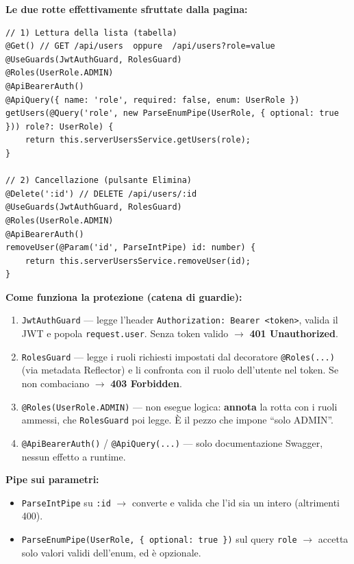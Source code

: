 \documentclass[11pt,a4paper]{article}
\newcommand{\code}[1]{\texttt{\small #1}}
\begin{document}
\textbf{Le due rotte effettivamente sfruttate dalla pagina:}

\begin{lstlisting}[language=TypeScriptX]
// 1) Lettura della lista (tabella)
@Get() // GET /api/users  oppure  /api/users?role=value
@UseGuards(JwtAuthGuard, RolesGuard)
@Roles(UserRole.ADMIN)
@ApiBearerAuth()
@ApiQuery({ name: 'role', required: false, enum: UserRole })
getUsers(@Query('role', new ParseEnumPipe(UserRole, { optional: true })) role?: UserRole) {
    return this.serverUsersService.getUsers(role);
}

// 2) Cancellazione (pulsante Elimina)
@Delete(':id') // DELETE /api/users/:id
@UseGuards(JwtAuthGuard, RolesGuard)
@Roles(UserRole.ADMIN)
@ApiBearerAuth()
removeUser(@Param('id', ParseIntPipe) id: number) {
    return this.serverUsersService.removeUser(id);
}
\end{lstlisting}

\textbf{Come funziona la protezione (catena di guardie):}

\begin{enumerate}[leftmargin=1.6em]
  \item \code{JwtAuthGuard} --- legge l'header \code{Authorization: Bearer <token>},
        valida il JWT e popola \code{request.user}. Senza token valido
        $\rightarrow$ \textbf{401 Unauthorized}.
  \item \code{RolesGuard} --- legge i ruoli richiesti impostati dal decoratore
        \code{@Roles(...)} (via metadata Reflector) e li confronta con il ruolo
        dell'utente nel token. Se non combaciano $\rightarrow$ \textbf{403 Forbidden}.
  \item \code{@Roles(UserRole.ADMIN)} --- non esegue logica: \textbf{annota} la rotta
        con i ruoli ammessi, che \code{RolesGuard} poi legge. È il pezzo che impone
        ``solo ADMIN''.
  \item \code{@ApiBearerAuth()} / \code{@ApiQuery(...)} --- solo documentazione
        Swagger, nessun effetto a runtime.
\end{enumerate}

\textbf{Pipe sui parametri:}

\begin{itemize}[leftmargin=1.4em]
  \item \code{ParseIntPipe} su \code{:id} $\rightarrow$ converte e valida che l'id
        sia un intero (altrimenti 400).
  \item \code{ParseEnumPipe(UserRole, \{ optional: true \})} sul query \code{role}
        $\rightarrow$ accetta solo valori validi dell'enum, ed è opzionale.
\end{itemize}
\end{document}
